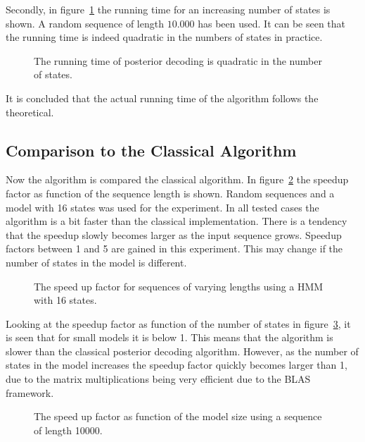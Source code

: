 Secondly, in figure~\ref{fig:posterior_N} the running time for an increasing
number of states is shown. A random sequence of length $10.000$ has been used. It
can be seen that the running time is indeed quadratic in the numbers of states
in practice.

\begin{figure}
  \centering
  
  \caption{The running time of posterior decoding is quadratic in the number of
    states.}
  \label{fig:posterior_N}
\end{figure}

It is concluded that the actual running time of the algorithm follows the
theoretical.

\subsection{Comparison to the Classical Algorithm}

Now the algorithm is compared the classical algorithm. In
figure~\ref{fig:posterior_speedup_vs_sequence_length} the speedup factor as
function of the sequence length is shown. Random sequences and a model with 16
states was used for the experiment. In all tested cases the algorithm is a bit
faster than the classical implementation. There is a tendency that the speedup
slowly becomes larger as the input sequence grows. Speedup factors between 1
and 5 are gained in this experiment. This may change if the number of states in
the model is different.

\begin{figure}
  \centering
  
  \caption{The speed up factor for sequences of varying lengths using a HMM
    with 16 states.}
  \label{fig:posterior_speedup_vs_sequence_length}
\end{figure}

Looking at the speedup factor as function of the number of states in
figure~\ref{fig:posterior_speedup_vs_N}, it is seen that for small models it is
below 1. This means that the algorithm is slower than the classical posterior
decoding algorithm. However, as the number of states in the model increases the
speedup factor quickly becomes larger than 1, due to the matrix multiplications
being very efficient due to the BLAS framework.

\begin{figure}
  \centering
  
  \caption{The speed up factor as function of the model size using a sequence
    of length 10000.}
  \label{fig:posterior_speedup_vs_N}
\end{figure}

